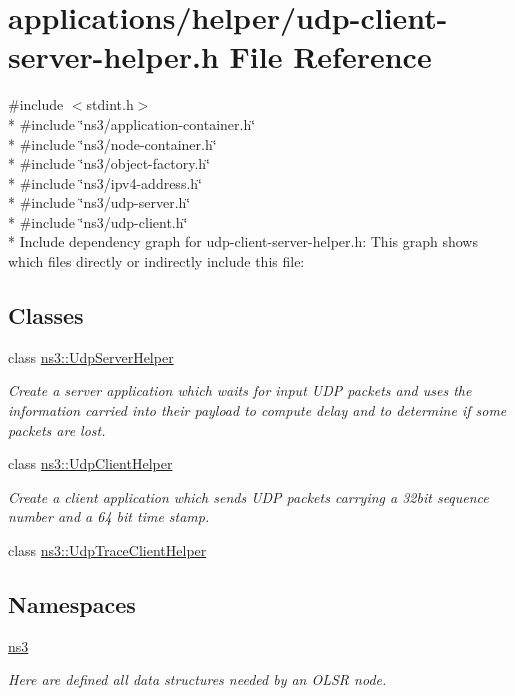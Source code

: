 \hypertarget{udp-client-server-helper_8h}{}\section{applications/helper/udp-\/client-\/server-\/helper.h File Reference}
\label{udp-client-server-helper_8h}
{\ttfamily \#include $<$stdint.\+h$>$}\\*
{\ttfamily \#include \char`\"{}ns3/application-\/container.\+h\char`\"{}}\\*
{\ttfamily \#include \char`\"{}ns3/node-\/container.\+h\char`\"{}}\\*
{\ttfamily \#include \char`\"{}ns3/object-\/factory.\+h\char`\"{}}\\*
{\ttfamily \#include \char`\"{}ns3/ipv4-\/address.\+h\char`\"{}}\\*
{\ttfamily \#include \char`\"{}ns3/udp-\/server.\+h\char`\"{}}\\*
{\ttfamily \#include \char`\"{}ns3/udp-\/client.\+h\char`\"{}}\\*
Include dependency graph for udp-\/client-\/server-\/helper.h\+:
This graph shows which files directly or indirectly include this file\+:
\subsection*{Classes}
\begin{DoxyCompactItemize}
\item 
class \hyperlink{classns3_1_1UdpServerHelper}{ns3\+::\+Udp\+Server\+Helper}
\begin{DoxyCompactList}\small\item\em Create a server application which waits for input U\+DP packets and uses the information carried into their payload to compute delay and to determine if some packets are lost. \end{DoxyCompactList}\item 
class \hyperlink{classns3_1_1UdpClientHelper}{ns3\+::\+Udp\+Client\+Helper}
\begin{DoxyCompactList}\small\item\em Create a client application which sends U\+DP packets carrying a 32bit sequence number and a 64 bit time stamp. \end{DoxyCompactList}\item 
class \hyperlink{classns3_1_1UdpTraceClientHelper}{ns3\+::\+Udp\+Trace\+Client\+Helper}
\end{DoxyCompactItemize}
\subsection*{Namespaces}
\begin{DoxyCompactItemize}
\item 
 \hyperlink{namespacens3}{ns3}
\begin{DoxyCompactList}\small\item\em Here are defined all data structures needed by an O\+L\+SR node. \end{DoxyCompactList}\end{DoxyCompactItemize}

